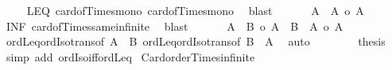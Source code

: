 \begin{isabellebody}
\ \ \ \isamarkupfalse%
\ LEQ\ card{\isacharunderscore}{\kern0pt}of{\isacharunderscore}{\kern0pt}Times{\isacharunderscore}{\kern0pt}mono{}\ card{\isacharunderscore}{\kern0pt}of{\isacharunderscore}{\kern0pt}Times{\isacharunderscore}{\kern0pt}mono{}\ \isamarkupfalse%
\ blast\isanewline
\ \ \ \isamarkupfalse%
\ \isamarkupfalse%
\ {\isachardoublequoteopen}{\isacharbar}{\kern0pt}A\ {\isasymtimes}\ A{\isacharbar}{\kern0pt}\ {\isacharequal}{\kern0pt}o\ {\isacharbar}{\kern0pt}A{\isacharbar}{\kern0pt}{\isachardoublequoteclose}\ \isamarkupfalse%
\ INF\ card{\isacharunderscore}{\kern0pt}of{\isacharunderscore}{\kern0pt}Times{\isacharunderscore}{\kern0pt}same{\isacharunderscore}{\kern0pt}infinite\ \isamarkupfalse%
\ blast\isanewline
\ \ \ \isamarkupfalse%
\ \isamarkupfalse%
\ {\isachardoublequoteopen}{\isacharbar}{\kern0pt}A\ {\isasymtimes}\ B{\isacharbar}{\kern0pt}\ {\isasymle}o\ {\isacharbar}{\kern0pt}A{\isacharbar}{\kern0pt}\ {\isasymand}\ {\isacharbar}{\kern0pt}B\ {\isasymtimes}\ A{\isacharbar}{\kern0pt}\ {\isasymle}o\ {\isacharbar}{\kern0pt}A{\isacharbar}{\kern0pt}{\isachardoublequoteclose}\isanewline
\ \ \ \isamarkupfalse%
\ ordLeq{\isacharunderscore}{\kern0pt}ordIso{\isacharunderscore}{\kern0pt}trans{\isacharbrackleft}{\kern0pt}of\ {\isachardoublequoteopen}{\isacharbar}{\kern0pt}A\ {\isasymtimes}\ B{\isacharbar}{\kern0pt}{\isachardoublequoteclose}{\isacharbrackright}{\kern0pt}\ ordLeq{\isacharunderscore}{\kern0pt}ordIso{\isacharunderscore}{\kern0pt}trans{\isacharbrackleft}{\kern0pt}of\ {\isachardoublequoteopen}{\isacharbar}{\kern0pt}B\ {\isasymtimes}\ A{\isacharbar}{\kern0pt}{\isachardoublequoteclose}{\isacharbrackright}{\kern0pt}\ \isamarkupfalse%
\ auto\isanewline
\ \ \isacommand{{\isacharbraceright}{\kern0pt}}\isamarkupfalse%
\isanewline
\ \ \isamarkupfalse%
\ \isamarkupfalse%
\ {\isacharquery}{\kern0pt}thesis\ \isamarkupfalse%
\ {\isacharparenleft}{\kern0pt}simp\ add{\isacharcolon}{\kern0pt}\ ordIso{\isacharunderscore}{\kern0pt}iff{\isacharunderscore}{\kern0pt}ordLeq{\isacharparenright}{\kern0pt}\isanewline
{}\isamarkupfalse%
%
\endisatagproof
{\isafoldproof}%
%
\isadelimproof
\isanewline
%
\endisadelimproof
\isanewline
{}\isamarkupfalse%
\ Card{\isacharunderscore}{\kern0pt}order{\isacharunderscore}{\kern0pt}Times{\isacharunderscore}{\kern0pt}infinite{\isacharcolon}{\kern0pt}\isanewline

\end{isabellebody}
